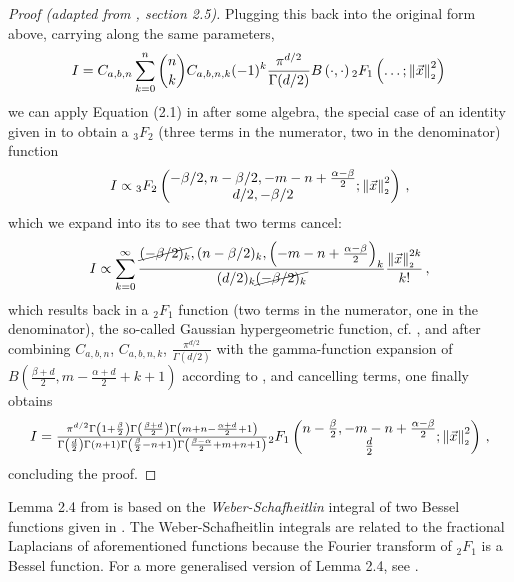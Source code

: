 \begin{proof}[Proof (adapted from \cite{2021-arbitrary-dimensions}, section 2.5)]
  Plugging this back into the original form above, carrying along the same parameters,
  \begin{align*}
    I = C_{a,b,n} \sum_{k=0}^n \binom{n}{k} C_{a,b,n,k} (-1)^k \frac{\pi^{d/2}}{\Gamma(d/2)} B\left(\cdot, \cdot\right) {}_2F_1\left(\dots; \left\lVert\vec{x}\right\rVert_{\scriptscriptstyle 2}^2\right)\,
  \end{align*}
  we can apply Equation (2.1) in \cite{2021-arbitrary-dimensions} after some algebra, the special case of an identity given in \cite{1986-crazy-hypergeometric-properties} to obtain a ${}_3F_2$ (three terms in the numerator, two in the denominator) function
  \begin{align*}
    I \propto {}_3F_2\left(\begin{matrix}-\beta/2, n-\beta/2, -m-n+\frac{\alpha-\beta}{2} \\d/2, -\beta/2\end{matrix}; \left\lVert\vec{x}\right\rVert_{\scriptscriptstyle 2}^2\right)\,,
  \end{align*}
  which we expand into its  to see that two terms cancel:
  \begin{align*}
    I \propto \sum_{k=0}^{\infty} \frac{\cancel{(-\beta/2)_k}, (n-\beta/2)_k, \left(-m-n+\frac{\alpha-\beta}{2}\right)_k}{(d/2)_k \cancel{(-\beta/2)_k}} \frac{\left\lVert\vec{x}\right\rVert_{\scriptscriptstyle 2}^{2k}}{k!}\,,
  \end{align*}
  which results back in a ${}_2F_1$ function (two terms in the numerator, one in the denominator), the so-called Gaussian hypergeometric function, cf. , and after combining $C_{a,b,n}$, $C_{a,b,n,k}$, $\frac{\pi^{d/2}}{\Gamma(d/2)}$ with the gamma-function expansion of $B\left(\tfrac{\beta+d}{2}, m-\tfrac{\alpha+d}{2}+k+1\right)$ according to , and cancelling terms, one finally obtains
  $$I = \tfrac{\pi^{d/2} \Gamma \left(1+\frac{\beta}{2}\right) \Gamma \left(\frac{\beta+d}{2}\right) \Gamma \left(m+n-\frac{\alpha+d}{2}+1\right)}{\Gamma \left(\frac{d}{2}\right) \Gamma (n+1) \Gamma \left(\frac{\beta}{2}-n+1\right) \Gamma \left(\frac{\beta-\alpha}{2}+m+n+1\right)}{}_2F_1\left(\begin{matrix}n-\frac{\beta}{2}, -m-n+\frac{\alpha-\beta}{2} \\\frac{d}{2}\end{matrix};\left\lVert\vec{x}\right\rVert_{\scriptscriptstyle 2}^2\right)\,,$$
  concluding the proof.
\end{proof}

Lemma 2.4 from \cite{2011-porous-medium-1,1967-formulas-and-theorems} is based on the \textit{Weber-Schafheitlin} integral of two Bessel functions given in \cite{1945-bessel-integral}.
The Weber-Schafheitlin integrals are related to the fractional Laplacians of aforementioned functions because the Fourier transform of ${}_2F_1$ is a Bessel function.
For a more generalised version of Lemma 2.4, see \cite{2014-barenblatt}.

